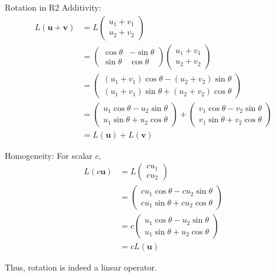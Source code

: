 \documentclass[12pt,a4paper]{article}
\newcommand{\vv}[1]{\mathbf{#1}}
\begin{document}
\begin{example}{Rotation in R2}
		Additivity: 
		\begin{align*}
			L(\vv{u} + \vv{v}) &= L\begin{pmatrix} u_1 + v_1 \\ u_2 + v_2 \end{pmatrix} \\
			&= \begin{pmatrix} \cos\theta & -\sin\theta \\ \sin\theta & \cos\theta \end{pmatrix} \begin{pmatrix} u_1 + v_1 \\ u_2 + v_2 \end{pmatrix} \\
			&= \begin{pmatrix} (u_1 + v_1)\cos\theta - (u_2 + v_2)\sin\theta \\ (u_1 + v_1)\sin\theta + (u_2 + v_2)\cos\theta \end{pmatrix} \\
			&= \begin{pmatrix} u_1\cos\theta - u_2\sin\theta \\ u_1\sin\theta + u_2\cos\theta \end{pmatrix} + \begin{pmatrix} v_1\cos\theta - v_2\sin\theta \\ v_1\sin\theta + v_2\cos\theta \end{pmatrix} \\
			&= L(\vv{u}) + L(\vv{v})
		\end{align*}
		
		Homogeneity: For scalar $c$,
		\begin{align*}
			L(c\vv{u}) &= L\begin{pmatrix} cu_1 \\ cu_2 \end{pmatrix} \\
			&= \begin{pmatrix} cu_1\cos\theta - cu_2\sin\theta \\ cu_1\sin\theta + cu_2\cos\theta \end{pmatrix} \\
			&= c\begin{pmatrix} u_1\cos\theta - u_2\sin\theta \\ u_1\sin\theta + u_2\cos\theta \end{pmatrix} \\
			&= cL(\vv{u})
		\end{align*}
		
		Thus, rotation is indeed a linear operator.
	\end{example}
	
\end{document}
